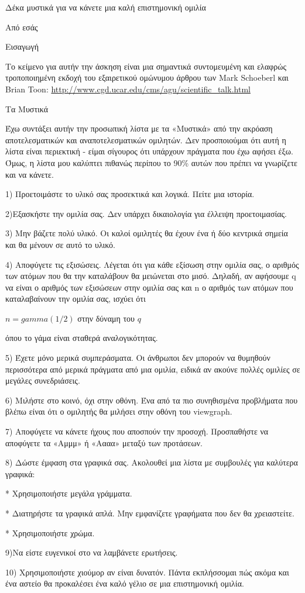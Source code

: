 \documentclass[12pt]{article}
\begin{document}
Δέκα μυστικά για να κάνετε μια καλή επιστημονική ομιλία

Από εσάς

Εισαγωγή

Το κείμενο για αυτήν την άσκηση είναι μια σημαντικά συντομευμένη και ελαφρώς τροποποιημένη εκδοχή του εξαιρετικού ομώνυμου άρθρου των \textlatin{Mark Schoeberl} και \textlatin{Brian Toon}:
\textlatin{ \url{http://www.cgd.ucar.edu/cms/agu/scientific_talk.html}}

Τα Μυστικά

Έχω συντάξει αυτήν την προσωπική λίστα με τα «Μυστικά» από την ακρόαση αποτελεσματικών και αναποτελεσματικών ομιλητών. Δεν προσποιούμαι ότι αυτή η λίστα είναι περιεκτική - είμαι σίγουρος ότι υπάρχουν πράγματα που έχω αφήσει έξω. Όμως, η λίστα μου καλύπτει πιθανώς περίπου το 90\% αυτών που πρέπει να γνωρίζετε και να κάνετε.

1) Προετοιμάστε το υλικό σας προσεκτικά και λογικά. Πείτε μια ιστορία.

2)Εξασκήστε την ομιλία σας. Δεν υπάρχει δικαιολογία για έλλειψη προετοιμασίας.

3) Μην βάζετε πολύ υλικό. Οι καλοί ομιλητές θα έχουν ένα ή δύο κεντρικά σημεία και θα μένουν σε αυτό το υλικό.

4) Αποφύγετε τις εξισώσεις. Λέγεται ότι για κάθε εξίσωση στην ομιλία σας, ο αριθμός των ατόμων που θα την καταλάβουν θα μειώνεται στο μισό. Δηλαδή, αν αφήσουμε q να είναι ο αριθμός των εξισώσεων στην ομιλία σας και n ο αριθμός των ατόμων που καταλαβαίνουν την ομιλία σας, ισχύει ότι

$n = gamma (1/2)$ στην δύναμη του $q$

όπου το γάμα είναι σταθερά αναλογικότητας.

5) Έχετε μόνο μερικά συμπεράσματα. Οι άνθρωποι δεν μπορούν να θυμηθούν περισσότερα από μερικά πράγματα από μια ομιλία, ειδικά αν ακούνε πολλές ομιλίες σε μεγάλες συνεδριάσεις.

6) Μιλήστε στο κοινό, όχι στην οθόνη. Ένα από τα πιο συνηθισμένα προβλήματα που βλέπω είναι ότι ο ομιλητής θα μιλήσει στην οθόνη του \textlatin{viewgraph}.

7) Αποφύγετε να κάνετε ήχους που αποσπούν την προσοχή. Προσπαθήστε να αποφύγετε τα «Αμμμ» ή «Αααα» μεταξύ των προτάσεων.

8) Δώστε έμφαση στα γραφικά σας. Ακολουθεί μια λίστα με συμβουλές για καλύτερα γραφικά:

* Χρησιμοποιήστε μεγάλα γράμματα.

* Διατηρήστε τα γραφικά απλά. Μην εμφανίζετε γραφήματα που δεν θα χρειαστείτε.

* Χρησιμοποιήστε χρώμα.

9)Να είστε ευγενικοί στο να λαμβάνετε ερωτήσεις.

10) Χρησιμοποιήστε χιούμορ αν είναι δυνατόν. Πάντα εκπλήσσομαι πώς ακόμα και ένα  αστείο θα προκαλέσει ένα καλό γέλιο σε μια επιστημονική ομιλία.
\end{document}
